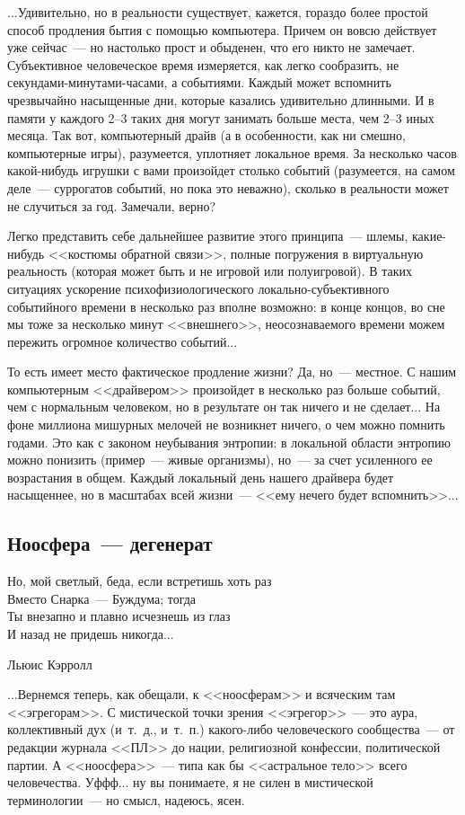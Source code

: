 \documentclass{scrbook}
\makeatletter
\newcommand{\defaultepigraphwidth}{0.5} %
\newcommand{\flqq}{<<}
\newcommand{\frqq}{>>}
\newcommand{\mdash}{~--- }
\newcommand{\ndash}{--}
\newcommand{\essaysection}[1]{\subsection*{#1}\nopagebreak}
\newcommand{\myepigraph}[3][\@empty]{
	\ifx\@empty#1
		\setlength{\epigraphwidth}{\defaultepigraphwidth\textwidth}
	\else
		\setlength{\epigraphwidth}{#1\textwidth}
	\fi
	\epigraph{#2}{#3}
	\setlength{\epigraphwidth}{\defaultepigraphwidth\textwidth} %
	\nopagebreak
}
\makeatother
\begin{document}
...Удивительно, но в реальности существует, кажется, гораздо более простой способ продления бытия с помощью компьютера. Причем он вовсю действует уже сейчас{\mdash}но настолько прост и обыденен, что его никто не замечает.
Субъективное человеческое время измеряется, как легко сообразить, не секундами-минутами-часами, а событиями. Каждый может вспомнить чрезвычайно насыщенные дни, которые казались удивительно длинными. И в памяти у каждого 2{\ndash}3 таких дня могут занимать больше места, чем 2{\ndash}3 иных месяца. Так вот, компьютерный драйв (а в особенности, как ни смешно, компьютерные игры), разумеется, уплотняет локальное время. За несколько часов какой-нибудь игрушки с вами произойдет столько событий (разумеется, на самом деле{\mdash}суррогатов событий, но пока это неважно), сколько в реальности может не случиться за год. Замечали, верно?

Легко представить себе дальнейшее развитие этого принципа{\mdash}шлемы, какие-нибудь {\flqq}костюмы обратной связи{\frqq}, полные погружения в виртуальную реальность (которая может быть и не игровой или полуигровой). В таких ситуациях ускорение психофизиологического локально-субъективного событийного времени в несколько раз вполне возможно: в конце концов, во сне мы тоже за несколько минут {\flqq}внешнего{\frqq}, неосознаваемого времени можем пережить огромное количество событий...

То есть имеет место фактическое продление жизни? Да, но{\mdash}местное. С нашим компьютерным {\flqq}драйвером{\frqq} произойдет в несколько раз больше событий, чем с нормальным человеком, но в результате он так ничего и не сделает... На фоне миллиона мишурных мелочей не возникнет ничего, о чем можно помнить годами. Это как с законом неубывания энтропии: в локальной области энтропию можно понизить (пример{\mdash}живые организмы), но{\mdash}за счет усиленного ее возрастания в общем. Каждый локальный день нашего драйвера будет насыщеннее, но в масштабах всей жизни{\mdash}{\flqq}ему нечего будет вспомнить{\frqq}...

\essaysection{Ноосфера{\mdash}дегенерат}

\myepigraph{Но, мой светлый, беда, если встретишь хоть раз \\
Вместо Снарка{\mdash}Буждума; тогда \\
Ты внезапно и плавно исчезнешь из глаз \\
И назад не придешь никогда...}
{Льюис Кэрролл}

...Вернемся теперь, как обещали, к {\flqq}ноосферам{\frqq} и всяческим там {\flqq}эгрегорам{\frqq}. С мистической точки зрения {\flqq}эгрегор{\frqq}{\mdash}это аура, коллективный дух (и~т.~д., и~т.~п.) какого-либо человеческого сообщества{\mdash}от редакции журнала {\flqq}ПЛ{\frqq} до нации, религиозной конфессии, политической партии. А {\flqq}ноосфера{\frqq}{\mdash}типа как бы {\flqq}астральное тело{\frqq} всего человечества. Уффф... ну вы понимаете, я не силен в мистической терминологии{\mdash}но смысл, надеюсь, ясен.
\end{document}
